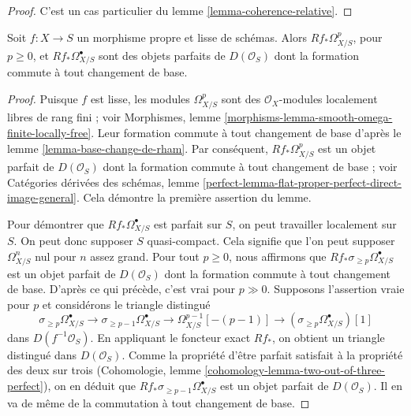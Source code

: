 \begin{proof}
C'est un cas particulier du lemme \ref{lemma-coherence-relative}.
\end{proof}

\begin{lemma}
\label{lemma-proper-smooth-de-Rham}
Soit $f : X \to S$ un morphisme propre et lisse de schémas. Alors
$Rf_*\Omega^p_{X/S}$, pour $p \geq 0$, et $Rf_*\Omega^\bullet_{X/S}$ sont
des objets parfaits de $D(\mathcal{O}_S)$ dont la formation commute
à tout changement de base.
\end{lemma}

\begin{proof}
Puisque $f$ est lisse, les modules $\Omega^p_{X/S}$ sont des
$\mathcal{O}_X$-modules localement libres de rang fini ; voir Morphismes, lemme
\ref{morphisms-lemma-smooth-omega-finite-locally-free}. Leur
formation commute à tout changement de base d'après
le lemme \ref{lemma-base-change-de-rham}. Par conséquent,
$Rf_*\Omega^p_{X/S}$ est un objet parfait de $D(\mathcal{O}_S)$
dont la formation commute à tout changement de base ; voir
Catégories dérivées des schémas, lemme
\ref{perfect-lemma-flat-proper-perfect-direct-image-general}.
Cela démontre la première assertion du lemme.

\medskip\noindent
Pour démontrer que $Rf_*\Omega^\bullet_{X/S}$ est parfait sur $S$, on peut travailler
localement sur $S$. On peut donc supposer $S$ quasi-compact. Cela signifie
que l'on peut supposer $\Omega^n_{X/S}$ nul pour $n$ assez grand.
Pour tout $p \geq 0$, nous affirmons que
$Rf_*\sigma_{\geq p}\Omega^\bullet_{X/S}$ est un
objet parfait de $D(\mathcal{O}_S)$ dont la formation commute
à tout changement de base. D'après ce qui précède,
c'est vrai pour $p \gg 0$. Supposons l'assertion vraie pour $p$
et considérons le triangle distingué
$$
\sigma_{\geq p}\Omega^\bullet_{X/S} \to
\sigma_{\geq p - 1}\Omega^\bullet_{X/S} \to
\Omega^{p - 1}_{X/S}[-(p - 1)] \to
(\sigma_{\geq p}\Omega^\bullet_{X/S})[1]
$$
dans $D(f^{-1}\mathcal{O}_S)$.
En appliquant le foncteur exact $Rf_*$, on obtient un triangle distingué
dans $D(\mathcal{O}_S)$.
Comme la propriété d'être parfait satisfait à la propriété des deux sur trois
(Cohomologie, lemme \ref{cohomology-lemma-two-out-of-three-perfect}),
on en déduit que $Rf_*\sigma_{\geq p - 1}\Omega^\bullet_{X/S}$ est un
objet parfait de $D(\mathcal{O}_S)$. Il en va de même de la
commutation à tout changement de base.
\end{proof}





